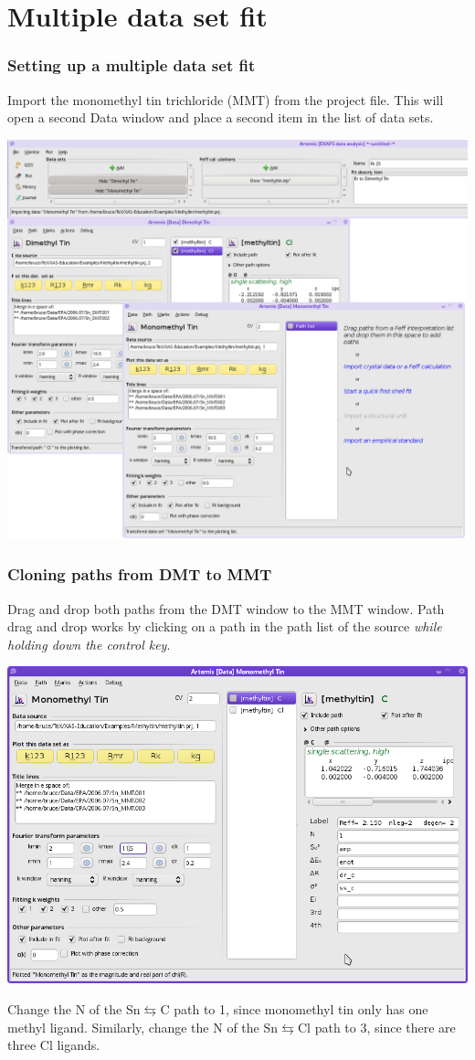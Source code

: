 \documentclass[10pt, xcolor=x11names, compress]{beamer}
\begin{document}
\section{Multiple data set fit}


\begin{frame}
  \frametitle{Setting up a multiple data set fit}
  Import the monomethyl tin trichloride (MMT) from the {\athena}
  project file.  This will open a second Data window and place a
  second item in the list of data sets.
  \begin{center}
    \includegraphics[width=0.7\linewidth]{images/mds.png}
  \end{center}
\end{frame}

\begin{frame}
  \frametitle{Cloning paths from DMT to MMT}
  \small
  Drag and drop both paths from the DMT window to the MMT window.
  Path drag and drop works by clicking on a path in the path list of
  the source \textit{while holding down the control key}.

  \begin{center}
    \includegraphics[width=0.65\linewidth]{images/MMT.png}
  \end{center}
  
  Change the N of the Sn$\leftrightarrows$C path to 1, since
  monomethyl tin only has one methyl ligand.  Similarly, change the N
  of the Sn$\leftrightarrows$Cl path to 3, since there are three Cl ligands.
\end{frame}
\end{document}

